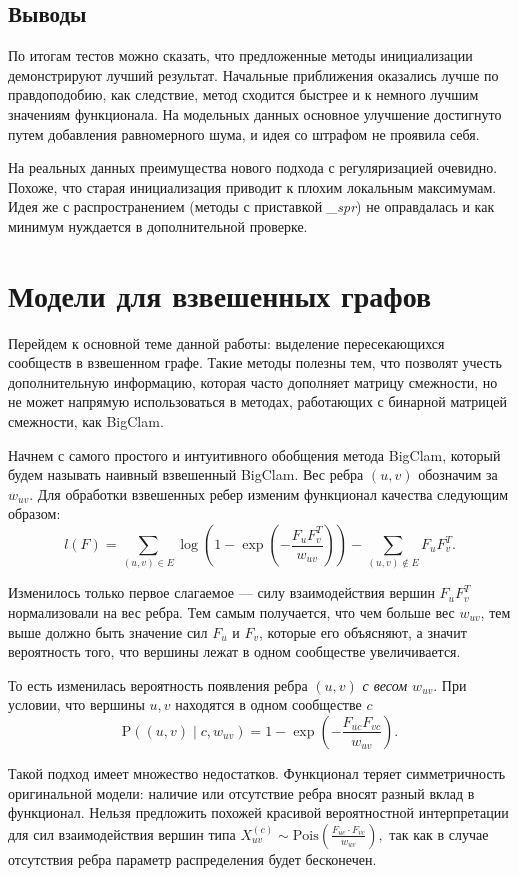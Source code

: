 \documentclass{ITaSconf}
\def\PP{\mathrm{P}}
\begin{document}
	\subsection{Выводы} 
	По итогам тестов можно сказать, что предложенные методы инициализации демонстрируют лучший результат. 
	Начальные приближения оказались лучше по правдоподобию, как следствие, метод сходится быстрее и к немного лучшим значениям функционала. 
	На модельных данных основное улучшение достигнуто путем добавления равномерного шума, и идея со штрафом не проявила себя.
	
	На реальных данных преимущества нового подхода с регуляризацией очевидно. 
	Похоже, что старая инициализация приводит к плохим локальным максимумам. 
	Идея же с распространением (методы с приставкой \textit{\_spr}) не оправдалась и как минимум нуждается в дополнительной проверке.
	
	\section{Модели для взвешенных графов}
	
	Перейдем к основной теме данной работы: выделение пересекающихся сообществ в взвешенном графе. 
	Такие методы полезны тем, что позволят учесть дополнительную информацию, которая часто дополняет матрицу смежности, но не может напрямую использоваться в методах, работающих с бинарной матрицей смежности, как BigClam.
	
	Начнем с самого простого и интуитивного обобщения метода BigClam, который будем называть наивный взвешенный BigClam.
	Вес ребра $(u,v)$ обозначим за $w_{uv}$. 
	Для обработки взвешенных ребер изменим функционал качества следующим образом:
	$$l(F) = \sum_{(u,v)\in E} \log\left(1 - \exp\left( - \dfrac{F_{u} F_{v}^T}{w_{uv}}\right)\right) - \sum_{(u,v) \notin E} F_{u} F_{v}^T.$$
	
	Изменилось только первое слагаемое --- силу взаимодействия вершин $F_u F_v^T$ нормализовали на вес ребра.
	Тем самым получается, что чем больше вес $w_{uv}$, тем выше должно быть значение сил $F_u$ и $F_v$, которые его объясняют, а значит вероятность того, что вершины лежат в одном сообществе увеличивается.
	
	То есть изменилась вероятность появления ребра $(u,v)$ \textit{с весом $w_{uv}$}. При условии, что вершины $u,v$ находятся в одном сообществе $c$
	$$\PP((u,v) \mid c, w_{uv})=1 - \exp\left(-\dfrac{F_{uc} F_{vc}}{w_{uv}}\right).$$
	
	Такой подход имеет множество недостатков.
	Функционал теряет симметричность оригинальной модели: наличие или отсутствие ребра вносят разный вклад в функционал. 
	Нельзя предложить похожей красивой вероятностной интерпретации для сил взаимодействия вершин типа $ X_{uv}^{(c)} \sim \mathrm{Pois}\left(\frac{F_{uc} \cdot F_{vc}}{w_{uv}}\right),$
	так как в случае отсутствия ребра параметр распределения будет бесконечен.
	
\end{document}
